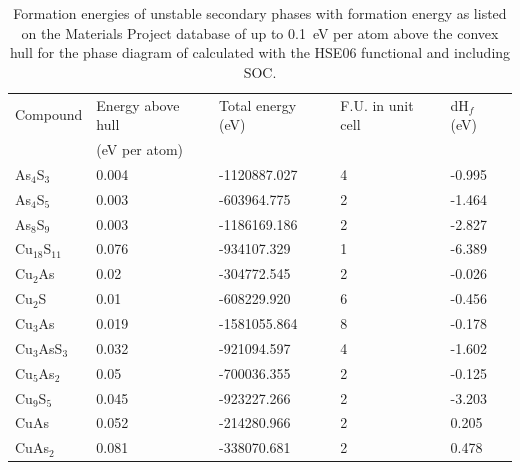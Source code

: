 \documentclass[11pt, twoside]{report}
\begin{document}
\begin{table}[]
\begin{tabular}{@{}lllll@{}}
\toprule
Compound & Energy above hull  & Total energy (eV) & F.U. in unit cell & dH$_f$ (eV)   \\ 
         & (eV per atom)      &                   &                   &               \\ \midrule
As$_4$S$_3$    & 0.004                           & -1120887.027      & 4                 & -0.995 \\
As$_4$S$_5$    & 0.003                           & -603964.775       & 2                 & -1.464   \\
As$_8$S$_9$    & 0.003                           & -1186169.186      & 2                 & -2.827  \\
Cu$_{18}$S$_{11}$  & 0.076                           & -934107.329      & 1                 & -6.389 \\
Cu$_2$As    & 0.02                            & -304772.545      & 2                 & -0.026 \\
Cu$_2$S     & 0.01                            & -608229.920      & 6                 & -0.456  \\
Cu$_3$As    & 0.019                           & -1581055.864      & 8                 & -0.178 \\
Cu$_3$AsS$_3$  & 0.032                           & -921094.597      & 4                 & -1.602 \\
Cu$_5$As$_2$   & 0.05                            & -700036.355      & 2                 & -0.125 \\
Cu$_9$S$_5$    & 0.045                           & -923227.266       & 2                 & -3.203 \\
CuAs     & 0.052                           & -214280.966      & 2                 & 0.205  \\
CuAs$_2$    & 0.081                           & -338070.681      & 2                 & 0.478  \\ \bottomrule
\end{tabular}
\caption{Formation energies of unstable secondary phases with formation energy as listed on the Materials Project database of up to \SI{0.1}{eV} per atom above the convex hull for the phase diagram of {\enargite} calculated with the HSE06 functional and including SOC.}\label{enargite_above_hull}
\end{table}
\end{document}
